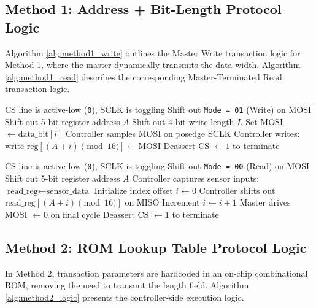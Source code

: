 \documentclass[conference]{IEEEtran}
\begin{document}
\subsection{Method 1: Address + Bit-Length Protocol Logic}
Algorithm \ref{alg:method1_write} outlines the Master Write transaction logic for Method 1, where the master dynamically transmits the data width. Algorithm \ref{alg:method1_read} describes the corresponding Master-Terminated Read transaction logic.

\begin{algorithm}[H]
\caption{Method 1 Master Write Transaction}
\label{alg:method1_write}
\begin{algorithmic}[1]
\REQUIRE CS line is active-low (\texttt{0}), SCLK is toggling
\STATE Shift out \texttt{Mode = 01} (Write) on MOSI
\STATE Shift out 5-bit register address $A$
\STATE Shift out 4-bit write length $L$
  \STATE Set MOSI $\leftarrow \text{data\_bit}[i]$
  \STATE Controller samples MOSI on posedge SCLK
  \STATE Controller writes: $\text{write\_reg}[(A + i) \pmod{16}] \leftarrow \text{MOSI}$
\ENDFOR
\STATE Deassert CS $\leftarrow 1$ to terminate
\end{algorithmic}
\end{algorithm}

\begin{algorithm}[H]
\caption{Method 1 Master Read Transaction}
\label{alg:method1_read}
\begin{algorithmic}[1]
\REQUIRE CS line is active-low (\texttt{0}), SCLK is toggling
\STATE Shift out \texttt{Mode = 00} (Read) on MOSI
\STATE Shift out 5-bit register address $A$
\STATE Controller captures sensor inputs: $\text{read\_reg} \leftarrow \text{sensor\_data}$
\STATE Initialize index offset $i \leftarrow 0$
  \STATE Controller shifts out $\text{read\_reg}[(A + i) \pmod{16}]$ on MISO
  \STATE Increment $i \leftarrow i + 1$
\ENDWHILE
\STATE Master drives MOSI $\leftarrow 0$ on final cycle
\STATE Deassert CS $\leftarrow 1$ to terminate
\end{algorithmic}
\end{algorithm}

\subsection{Method 2: ROM Lookup Table Protocol Logic}
In Method 2, transaction parameters are hardcoded in an on-chip combinational ROM, removing the need to transmit the length field. Algorithm \ref{alg:method2_logic} presents the controller-side execution logic.
\end{document}
